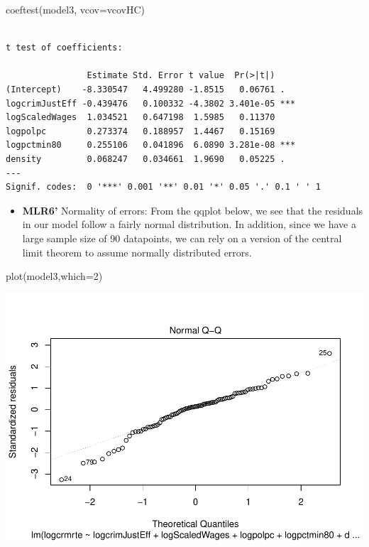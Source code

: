 \documentclass[]{article}
\newenvironment{Shaded}{}{}
\newcommand{\DataTypeTok}[1]{#1}
\newcommand{\DecValTok}[1]{#1}
\newcommand{\KeywordTok}[1]{\textcolor[rgb]{0.00,0.00,1.00}{#1}}
\newcommand{\NormalTok}[1]{#1}
\providecommand{\tightlist}{%
  \setlength{\itemsep}{0pt}\setlength{\parskip}{0pt}}
\begin{document}
\begin{Shaded}
\begin{Highlighting}[]
\KeywordTok{coeftest}\NormalTok{(model3, }\DataTypeTok{vcov=}\NormalTok{vcovHC)}
\end{Highlighting}
\end{Shaded}

\begin{verbatim}

t test of coefficients:

                Estimate Std. Error t value  Pr(>|t|)    
(Intercept)    -8.330547   4.499280 -1.8515   0.06761 .  
logcrimJustEff -0.439476   0.100332 -4.3802 3.401e-05 ***
logScaledWages  1.034521   0.647198  1.5985   0.11370    
logpolpc        0.273374   0.188957  1.4467   0.15169    
logpctmin80     0.255106   0.041896  6.0890 3.281e-08 ***
density         0.068247   0.034661  1.9690   0.05225 .  
---
Signif. codes:  0 '***' 0.001 '**' 0.01 '*' 0.05 '.' 0.1 ' ' 1
\end{verbatim}

\begin{itemize}
\tightlist
\item
  \textbf{MLR6'} Normality of errors: From the qqplot below, we see that
  the residuals in our model follow a fairly normal distribution. In
  addition, since we have a large sample size of 90 datapoints, we can
  rely on a version of the central limit theorem to assume normally
  distributed errors.
\end{itemize}

\begin{Shaded}
\begin{Highlighting}[]
\KeywordTok{plot}\NormalTok{(model3,}\DataTypeTok{which=}\DecValTok{2}\NormalTok{)}
\end{Highlighting}
\end{Shaded}

\includegraphics{Bagnard_Gaustad_Hartman_Leung_Lab_3_files/figure-latex/unnamed-chunk-87-1.pdf}
\end{document}
